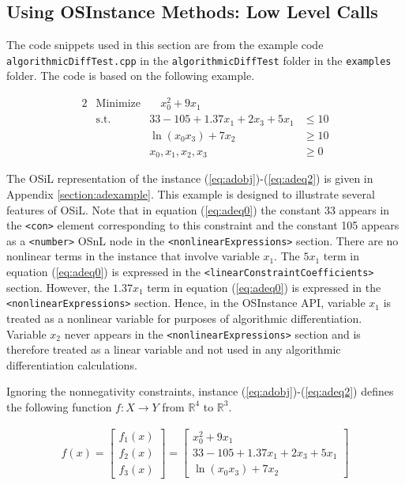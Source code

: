 \documentclass[11pt]{article}
\renewcommand{\_}{{\char"5F}}
\renewcommand{\{}{{\char"7B}}
\renewcommand{\}}{{\char"7D}}
\renewcommand{\^}{{\char"0D}}
\renewcommand{\'}{{\char"0D}}
\begin{document}
\subsection{Using OSInstance Methods: Low Level Calls}

  The code snippets used in this section  are from the example code {\tt algorithmicDiffTest.cpp} in the {\tt algorithmicDiffTest} folder in the {\tt examples} folder.  The  code is based on the following example.

\begin{alignat}{2}
& \mbox{Minimize} & \quad  x_{0}^{2} + 9x_{1} \label{eq:adobj}\\
& \mbox{s.t.} & 33 - 105 + 1.37 x_{1} + 2x_{3} + 5 x_{1} &\le 10  \label{eq:adeq0}\\
& & \ln(x_{0} x_{3}) + 7x_{2} &\ge 10 \label{eq:adeq1} \\
& & x_{0}, x_{1}, x_{2}, x_{3} &\ge 0 \label{eq:adeq2}
\end{alignat}

The OSiL representation of the instance  (\ref{eq:adobj})-(\ref{eq:adeq2}) is given in Appendix \ref{section:adexample}.  This example is designed to illustrate several features of OSiL. Note that in equation (\ref{eq:adeq0}) the constant 33 appears in the {\tt <con>} element corresponding to this constraint and the constant 105 appears as a {\tt <number>} OSnL node in the {\tt <nonlinearExpressions>} section.  There are no nonlinear terms in the instance that involve variable $x_{1}.$  The $5 x_{1}$ term in equation (\ref{eq:adeq0}) is expressed in the {\tt <linearConstraintCoefficients>} section.  However,  the $1.37 x_{1}$ term in equation (\ref{eq:adeq0}) is expressed in the {\tt <nonlinearExpressions>} section.  Hence, in the OSInstance API, variable $x_{1}$ is treated as a nonlinear variable for purposes of algorithmic differentiation. Variable $x_{2}$ never appears in the  {\tt <nonlinearExpressions>} section and is therefore treated as a linear variable and not used  in any algorithmic differentiation calculations.

Ignoring the nonnegativity constraints, instance (\ref{eq:adobj})-(\ref{eq:adeq2})  defines the following function $f:X \rightarrow Y$ from $ \mathbb{R}^{4}$ to $ \mathbb{R}^{3}.$

\begin{eqnarray}
f(x) =
\left[
\begin{array}{r}
f_{1}(x) \\
f_{2}(x) \\
f_{3}(x)
\end{array}
\right]
=
\left[
\begin{array}{r}
x_{0}^{2} + 9x_{1}  \\
33 - 105 + 1.37 x_{1} + 2x_{3} + 5 x_{1} \\
\ln(x_{0} x_{3}) + 7x_{2}
\end{array}
\right] \label{eq:definef}
\end{eqnarray}
\end{document}
